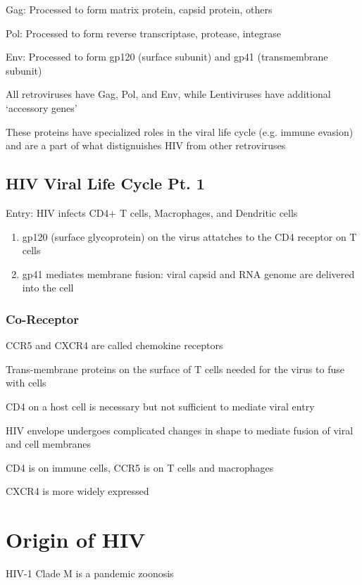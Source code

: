 \documentclass{notes}
\begin{document}
Gag: Processed to form matrix protein, capsid protein, others

Pol: Processed to form reverse transcriptase, protease, integrase

Env: Processed to form gp120 (surface subunit) and gp41 (transmembrane subunit)

All retroviruses have Gag, Pol, and Env, while Lentiviruses have additional `accessory genes'

These proteins have specialized roles in the viral life cycle (e.g. immune evasion) and are a part of what distignuishes HIV from other retroviruses

\subsection{HIV Viral Life Cycle Pt. 1}

Entry: HIV infects CD4+ T cells, Macrophages, and Dendritic cells

\begin{enumerate}
    \item gp120 (surface glycoprotein) on the virus attatches to the CD4 receptor on T cells
    \item gp41 mediates membrane fusion: viral capsid and RNA genome are delivered into the cell
\end{enumerate}

\subsubsection{Co-Receptor}

CCR5 and CXCR4 are called chemokine receptors

\tab Trans-membrane proteins on the surface of T cells needed for the virus to fuse with cells

\tab \indicates CD4 on a host cell is necessary but not sufficient to mediate viral entry

HIV envelope undergoes complicated changes in shape to mediate fusion of viral and cell membranes

CD4 is on immune cells, CCR5 is on T cells and macrophages

CXCR4 is more widely expressed

\section{Origin of HIV}

HIV-1 Clade M is a pandemic zoonosis
\end{document}
